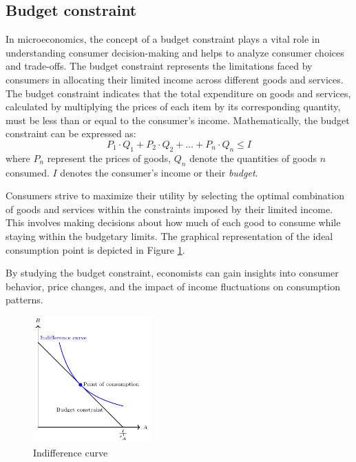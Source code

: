 \documentclass[
  12pt,
  oneside]{book}
\theoremstyle{definition}
\theoremstyle{definition}
\theoremstyle{definition}
\theoremstyle{definition}
\theoremstyle{remark}
\begin{document}
\subsection{Budget constraint}\label{budget-constraint}

In microeconomics, the concept of a budget constraint plays a vital role in understanding consumer decision-making and helps to analyze consumer choices and trade-offs. The budget constraint represents the limitations faced by consumers in allocating their limited income across different goods and services. The budget constraint indicates that the total expenditure on goods and services, calculated by multiplying the prices of each item by its corresponding quantity, must be less than or equal to the consumer's income.
Mathematically, the budget constraint can be expressed as:
\[
P_1 \cdot Q_1 + P_2 \cdot Q_2 + \ldots + P_n \cdot Q_n \leq I
\]
where \(P_n\) represent the prices of goods, \(Q_n\) denote the quantities of goods \(n\) consumed. \(I\) denotes the consumer's income or their \emph{budget}.

Consumers strive to maximize their utility by selecting the optimal combination of goods and services within the constraints imposed by their limited income. This involves making decisions about how much of each good to consume while staying within the budgetary limits. The graphical representation of the ideal consumption point is depicted in Figure \ref{fig:pointofconsumption}.

By studying the budget constraint, economists can gain insights into consumer behavior, price changes, and the impact of income fluctuations on consumption patterns.

\begin{figure}
\centering
\includegraphics[width=0.4\textwidth,height=\textheight]{fig/pointofconsumption.png}
\caption{\label{fig:pointofconsumption} Indifference curve}
\end{figure}
\end{document}
